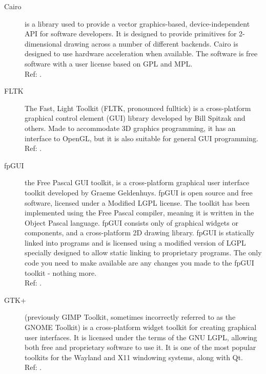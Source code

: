 \begin{description}
    \item[Cairo] is a library used to provide a vector graphics-based,
		device-independent API for software developers. It is designed
		to provide primitives for 2-dimensional drawing across a number
		of different backends. Cairo is designed to use hardware
		acceleration when available.
		The software is free software with a user license based on GPL
		and MPL. \hspace*{\fill}\\Ref: \cite{wiki:cairo}.

    \item[FLTK] The Fast, Light Toolkit (FLTK, pronounced fulltick) is a
		cross-platform graphical control element (GUI)
		library developed by Bill Spitzak and others. Made to
		accommodate 3D graphics programming, it has an interface to
		OpenGL, but it is also suitable for general GUI programming.
		\hspace*{\fill}\\Ref: \cite{wiki:fltk}.

    \item[fpGUI] the Free Pascal GUI toolkit, is a cross-platform
		graphical user interface toolkit developed by Graeme Geldenhuys.
		fpGUI is open source and free software, licensed under a Modified LGPL
		license. The toolkit has been implemented using the Free Pascal
		compiler, meaning it is written in the Object Pascal language.
		fpGUI consists only of graphical widgets or components, and a
		cross-platform 2D drawing library.
		fpGUI is statically linked into programs and is licensed using a
		modified version of LGPL specially designed to allow static linking to
		proprietary programs. The only code you need to make available are
		any changes you made to the fpGUI toolkit - nothing more.
		\hspace*{\fill}\\Ref: \cite{wiki:fpgui}.

    \item[GTK+] (previously GIMP Toolkit, sometimes incorrectly referred to
		as the GNOME Toolkit) is a cross-platform widget toolkit for
		creating graphical user interfaces. It is licensed under the terms
		of the GNU LGPL, allowing both free and proprietary software to use
		it. It is one of the most popular toolkits for the Wayland and
		X11 windowing systems, along with Qt.
		\hspace*{\fill}\\Ref: \cite{wiki:gtk+}.


\end{description}

